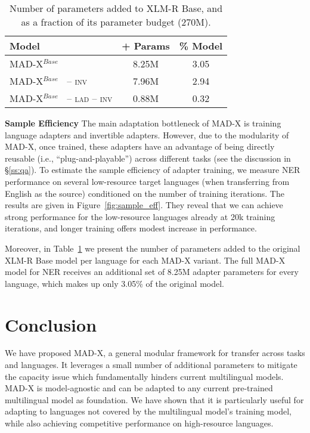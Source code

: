 \documentclass[11pt,a4paper]{article}
\newcommand{\model}[1]{\textsc{MAD-X}}
\begin{document}
\begin{table}[]
\centering
\def\arraystretch{0.99}
{\footnotesize
\resizebox{\columnwidth}{!}
{\begin{tabular}{l cc}
\toprule
Model	&	+ Params	&	\% Model	  \\
\midrule
\model{}$^{Base}$	 &	 8.25M	&  3.05  	\\
\model{}$^{Base}$ $\:$ -- \textsc{inv}	& 7.96M	& 2.94	\\
\model{}$^{Base}$ $\:$ -- \textsc{lad} -- \textsc{inv}	&	0.88M 	&	0.32 	\\
\bottomrule
\end{tabular}}
} 
\caption{Number of parameters added to  
XLM-R Base, 
and as a fraction of its parameter budget (270M).}
\label{tab:parameters} 
\end{table}

\vspace{1.8mm}
\noindent \textbf{Sample Efficiency}\hspace{0.3mm}
The main adaptation bottleneck of \model{} is training language adapters and invertible adapters. However, due to the modularity of \model{}, once trained, these adapters have an advantage of being directly reusable (i.e., ``plug-and-playable'') across different tasks (see the discussion in \S\ref{ss:qa}). To estimate the sample efficiency of adapter training, we measure NER performance on several low-resource target languages (when transferring from English as the source) conditioned on the number of training iterations. The results are given in Figure~\ref{fig:sample_eff}. They reveal that we can achieve strong performance for the low-resource languages already at 20k training iterations, and longer training offers modest increase in performance.

 
Moreover, in Table~\ref{tab:parameters} we present the number of parameters added to the original XLM-R Base model per language for each \model{} variant. The full \model{} model for NER receives an additional set of 8.25M adapter parameters for every language, which makes up only 3.05\% of the original model.

 
\section{Conclusion}

We have proposed \model{}, a general modular framework for transfer across tasks and languages. It leverages a small number of additional parameters to mitigate the capacity issue which fundamentally hinders current multilingual models. \model{} is model-agnostic and can be adapted to any current pre-trained multilingual model as foundation. We have shown that it is particularly useful for adapting to languages not covered by the multilingual model's training model, while also achieving competitive performance on high-resource languages. 
\end{document}
